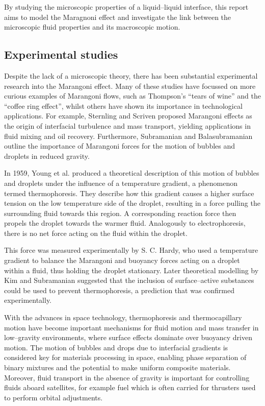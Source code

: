 By studying the microscopic properties of a liquid--liquid interface, this report aims to model the Maragnoni effect and investigate the link between the microscopic fluid properties and its macroscopic motion.

\subsection{Experimental studies}
Despite the lack of a microscopic theory, there has been substantial experimental research into the Marangoni effect.
Many of these studies have focussed on more curious examples of Marangoni flows, such as Thompson's ``tears of wine''\cite{JThompson,Venerus,Tadmor,Cazabat1995} and the ``coffee ring effect'',\cite{Sefian,HuLarson,Sefiane2014} whilst others have shown its importance in technological applications.
For example, Sternling and Scriven\cite{SternlingScriven} proposed Marangoni effects as the origin of interfacial turbulence and mass transport, yielding applications in fluid mixing and oil recovery.\cite{Aguilera2005,LyfordA,LyfordB} 
Furthermore, Subramanian and Balasubramanian outline the importance of Marangoni forces for the motion of bubbles and droplets in reduced gravity.\cite{MotionOfBubblesAndDrops} 

In 1959, Young et al. produced a theoretical description of this motion of bubbles and droplets under the influence of a temperature gradient, a phenomenon termed thermophoresis.\cite{Young1959}
They describe how this gradient causes a higher surface tension on the low temperature side of the droplet, resulting in a force pulling the surrounding fluid towards this region.
A corresponding reaction force then propels the droplet towards the warmer fluid.
Analogously to electrophoresis, there is no net force acting on the fluid within the droplet.

This force was measured experimentally by S. C. Hardy,\cite{Hardy1978} who used a temperature gradient to balance the Marangoni and buoyancy forces acting on a droplet within a fluid, thus holding the droplet stationary.
Later theoretical modelling by Kim and Subramanian suggested that the inclusion of surface--active substances could be used to prevent thermophoresis,\cite{KimSubramanianA,KimSubramanianB} a prediction that was confirmed experimentally.\cite{BartonSubramanian,ChenStebe}

With the advances in space technology, thermophoresis and thermocapillary motion have become important mechanisms for fluid motion and mass transfer in low--gravity environments, where surface effects dominate over buoyancy driven motion.
The motion of bubbles and drops due to interfacial gradients is considered key for materials processing in space, enabling phase separation of binary mixtures and the potential to make uniform composite materials.\cite{BartonSubramanian}
Moreover, fluid transport in the absence of gravity is important for controlling fluids aboard satellites, for example fuel which is often carried for thrusters used to perform orbital adjustments.\cite{MotionOfBubblesAndDrops} 

